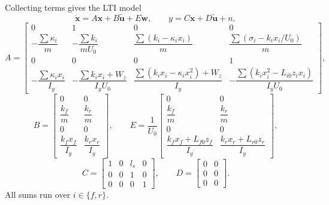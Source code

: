 \documentclass[11pt,a4paper]{article}
\begin{document}
Collecting terms gives the LTI model
\begin{equation}
\dot{\bm x}=A\bm x+B\tilde{\bm u}+E\bm w, \qquad y=C\bm x+D\tilde{\bm u}+n,
\end{equation}
\begin{equation}
A=\begin{bmatrix}
0 & 1 & 0 & 0\\[4pt]
-\dfrac{\sum\kappa_i}{m} &
-\dfrac{\sum k_i}{mU_0} &
\dfrac{\sum (k_i-\kappa_i x_i)}{m} &
\dfrac{\sum(\sigma_i-k_i x_i/U_0)}{m}\\[10pt]
0 & 0 & 0 & 1\\[4pt]
-\dfrac{\sum\kappa_i x_i}{I_y} &
-\dfrac{\sum k_i x_i + W_z}{I_yU_0} &
\dfrac{\sum (k_i x_i-\kappa_i x_i^2)+W_z}{I_y} &
-\dfrac{\sum (k_i x_i^2-L_{i0}z_i x_i)}{I_yU_0}
\end{bmatrix},
\label{eq:Asym}
\end{equation}
\begin{equation}
B=\begin{bmatrix}
0 & 0\\[2pt]
\dfrac{k_f}{m} & \dfrac{k_r}{m}\\[8pt]
0 & 0\\[2pt]
\dfrac{k_f x_f}{I_y} & \dfrac{k_r x_r}{I_y}
\end{bmatrix},
\qquad
E=\frac{1}{U_0}\begin{bmatrix}
0 & 0\\[2pt]
\dfrac{k_f}{m} & \dfrac{k_r}{m}\\[8pt]
0 & 0\\[2pt]
\dfrac{k_f x_f+L_{f0}z_f}{I_y} & \dfrac{k_r x_r+L_{r0}z_r}{I_y}
\end{bmatrix},
\label{eq:Bsym}
\end{equation}
\begin{equation}
C=\begin{bmatrix}1 & 0 & l_s & 0\\ 0 & 0 & 1 & 0\\ 0 & 0 & 0 & 1\end{bmatrix},
\qquad
D=\begin{bmatrix}0 & 0\\ 0 & 0\\ 0 & 0\end{bmatrix}.
\end{equation}
All sums run over $i\in\{f,r\}$.
\end{document}
